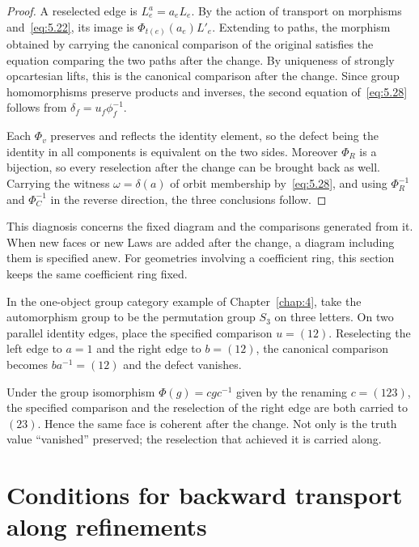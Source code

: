 \begin{proof}

A reselected edge is $L_e^a=a_eL_e$. By the action of transport on morphisms
and~\eqref{eq:5.22}, its image is $\Phi_{t(e)}(a_e)L'_e$. Extending to paths, the morphism
obtained by carrying the canonical comparison of the original satisfies the equation comparing the
two paths after the change. By uniqueness of strongly opcartesian lifts, this is the
canonical comparison after the change. Since group homomorphisms preserve products and
inverses, the second equation of~\eqref{eq:5.28} follows from $\delta_f=u_f\phi_f^{-1}$.

Each $\Phi_v$ preserves and reflects the identity element, so the defect being the identity
in all components is equivalent on the two sides. Moreover $\Phi_R$ is a bijection, so every
reselection after the change can be brought back as well. Carrying the witness
$\omega=\delta(a)$ of orbit membership by~\eqref{eq:5.28}, and using $\Phi_R^{-1}$ and
$\Phi_C^{-1}$ in the reverse direction, the three conclusions follow.

\end{proof}

This diagnosis concerns the fixed diagram and the comparisons generated from it. When new
faces or new Laws are added after the change, a diagram including them is specified anew.
For geometries involving a coefficient ring, this section keeps the same coefficient ring
fixed.

\begin{example}\label{ex:5.23}

In the one-object group category example of Chapter~\ref{chap:4}, take the automorphism
group to be the permutation group $S_3$ on three letters. On two parallel identity edges,
place the specified comparison $u=(12)$. Reselecting the left edge to $a=1$ and the right
edge to $b=(12)$, the canonical comparison becomes $ba^{-1}=(12)$ and the defect vanishes.

Under the group isomorphism $\Phi(g)=cgc^{-1}$ given by the renaming $c=(123)$, the
specified comparison and the reselection of the right edge are both carried to $(23)$. Hence
the same face is coherent after the change. Not only is the truth value ``vanished''
preserved; the reselection that achieved it is carried along.

\end{example}

\section{Conditions for backward transport along refinements}\label{sec:5.7}

